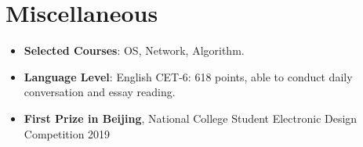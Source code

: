 \documentclass{resume}
\newcommand{\en}[1]{#1}
\newcommand{\zh}[1]{}
\begin{document}
\section{\en{Miscellaneous}\zh{杂项}}
\begin{itemize}[parsep=0.25ex]
      \item \en{\textbf{Selected Courses}: OS, Network, Algorithm.}
            \zh{\textbf{主修课程}: 操作系统、计算机网络、算法设计与分析}
      \item \en{\textbf{Language Level}: English CET-6: 618 points, able to conduct daily conversation and essay reading.}
            \zh{\textbf{语言水平}: 英语 CET-6: 618 分，能够进行日常对话和论文阅读}
      \item \en{\textbf{First Prize in Beijing}, National College Student Electronic Design Competition 2019}
            \zh{\textbf{北京市一等奖}, 2019 年全国大学生电子设计竞赛}
\end{itemize}
\end{document}
